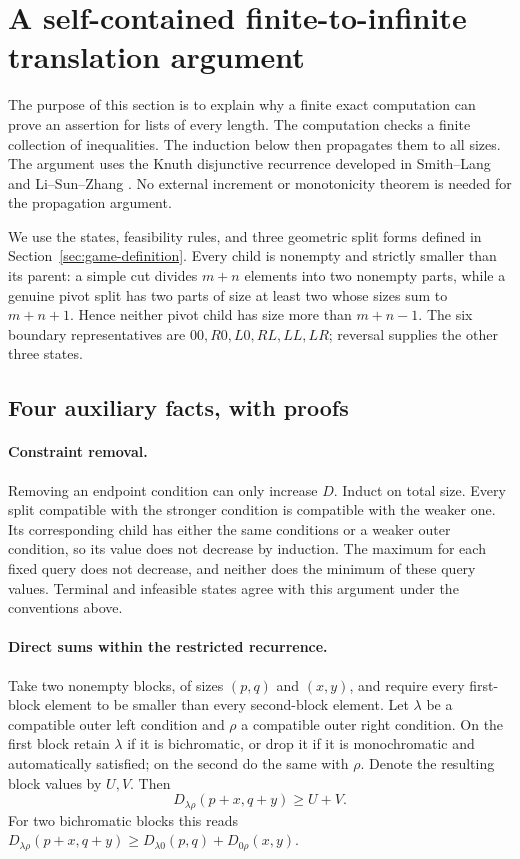 \documentclass[11pt]{article}
\theoremstyle{definition}
\theoremstyle{remark}
\begin{document}
\section{A self-contained finite-to-infinite translation argument}
\label{sec:expanded-translation}

The purpose of this section is to explain why a finite exact computation can
prove an assertion for lists of every length. The computation checks a finite
collection of inequalities. The induction below then propagates them to all
sizes. The argument uses the Knuth disjunctive recurrence developed in
Smith--Lang and Li--Sun--Zhang \cite{smithlang,lsz2016,lsz2020}. No external
increment or monotonicity theorem is needed for the propagation argument.

We use the states, feasibility rules, and three geometric split forms
defined in Section~\ref{sec:game-definition}. Every child is nonempty and
strictly smaller than its parent: a simple cut divides $m+n$ elements into
two nonempty parts, while a genuine pivot split has two parts of size at
least two whose sizes sum to $m+n+1$. Hence neither pivot child has size
more than $m+n-1$. The six boundary representatives are
$00,R0,L0,RL,LL,LR$; reversal supplies the other three states.

\subsection{Four auxiliary facts, with proofs}

\paragraph{Constraint removal.}
Removing an endpoint condition can only increase $D$. Induct on total size.
Every split compatible with the stronger condition is compatible with the
weaker one. Its corresponding child has either the same conditions or a
weaker outer condition, so its value does not decrease by induction. The
maximum for each fixed query does not decrease, and neither does the
minimum of these query values. Terminal and infeasible states agree with
this argument under the conventions above.

\paragraph{Direct sums within the restricted recurrence.}
Take two nonempty blocks, of sizes $(p,q)$ and $(x,y)$, and require every
first-block element to be smaller than every second-block element.
Let $\lambda$ be a compatible outer left condition and $\rho$ a compatible
outer right condition. On the first block retain $\lambda$ if it is
bichromatic, or drop it if it is monochromatic and automatically satisfied;
on the second do the same with $\rho$. Denote the resulting block values
by $U,V$. Then
\begin{equation}
 D_{\lambda\rho}(p+x,q+y)\ge U+V.
 \tag{DS}
\end{equation}
For two bichromatic blocks this reads
$D_{\lambda\rho}(p+x,q+y)\ge
D_{\lambda0}(p,q)+D_{0\rho}(x,y)$.
\end{document}
